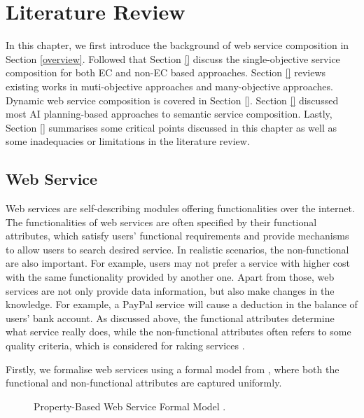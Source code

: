 \chapter{Literature Review}\label{C:review}

In this chapter, we first introduce the background of web service composition in Section \ref{overview}.  Followed that Section \ref{} discuss the single-objective service composition for both EC and non-EC based approaches. Section  \ref{} reviews existing works in muti-objective approaches and many-objective approaches.  Dynamic web service composition is covered in Section \ref{}. Section \ref{}  discussed most AI planning-based approaches to semantic service composition. Lastly, Section \ref{} summarises some critical points discussed in this chapter as well as some inadequacies or limitations in the literature review.

\section{Web Service}\label{service}
Web services are self-describing modules offering functionalities over the internet. The functionalities of web services are often specified by their functional attributes, which satisfy users' functional requirements and provide mechanisms to allow users to search desired service. In realistic scenarios, the non-functional are also important. For example, users may not prefer a service with higher cost with the same functionality provided by another one. Apart from those, web services are not only provide data information, but also make changes in the knowledge. For example, a PayPal service will cause a deduction in the balance of users' bank account. As discussed above, the functional attributes determine what service really does, while the non-functional attributes often refers to some quality criteria, which is considered for raking services \cite{agarwal2009making}. 

Firstly, we formalise web services using a formal model from \cite{agarwal2010d5}, where both the functional and non-functional attributes are captured uniformly.

\begin{figure}
\centerline{
}
\caption{Property-Based Web Service Formal Model \cite{agarwal2010d5}.}
\label{fig:ws}
\end{figure}


